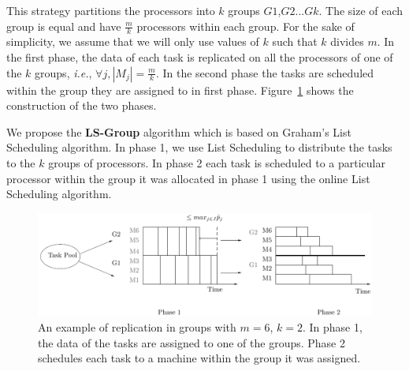 \documentclass[10pt, conference, compsocconf]{IEEEtran}
\begin{document}
This strategy partitions the processors into $k$ groups
$G1$,$G2$...$Gk$. The size of each group is equal and have
$\frac{m}{k}$ processors within each group. For the sake of
simplicity, we assume that we will only use values of $k$ such that
$k$ divides $m$. In the first phase, the data of each task is
replicated on all the processors of one of the $k$ groups,
{\em i.e.}, $\forall j, |M_j|= \frac{m}{k}$. In the second phase the tasks
are scheduled within the group they are assigned to in first phase.
Figure~\ref{fig:Model 3} shows the construction of the two phases.

We propose the \textbf{LS-Group} algorithm which is based on Graham's
List Scheduling algorithm. In phase 1, we use List Scheduling to
distribute the tasks to the $k$ groups of processors. In phase 2 each
task is scheduled to a particular processor within the group it was
allocated in phase 1 using the online List Scheduling algorithm.

\begin{figure}[htp] 
\centering
\includegraphics[width=\linewidth]{model3.pdf}
\caption{An example of replication in groups with $m = 6$, $k = 2$. In
  phase 1, the data of the tasks are assigned to one of the
  groups. Phase 2 schedules each task to a machine within the group it was 
  assigned.}
\label{fig:Model 3}
\end{figure}
\end{document}
